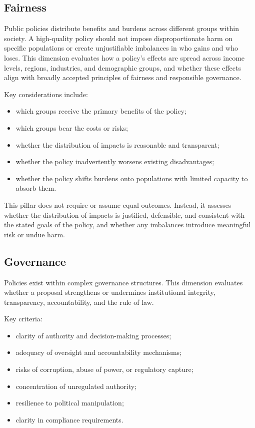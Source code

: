 \documentclass[12pt]{article}
\begin{document}
\subsection{Fairness}

Public policies distribute benefits and burdens across different groups within society. A high-quality policy should not
impose disproportionate harm on specific populations or create unjustifiable imbalances in who gains and who loses. This
dimension evaluates how a policy's effects are spread across income levels, regions, industries, and demographic groups,
and whether these effects align with broadly accepted principles of fairness and responsible governance.

Key considerations include:
\begin{itemize}
    \item which groups receive the primary benefits of the policy;
    \item which groups bear the costs or risks;
    \item whether the distribution of impacts is reasonable and transparent;
    \item whether the policy inadvertently worsens existing disadvantages;
    \item whether the policy shifts burdens onto populations with limited capacity to absorb them.
\end{itemize}

This pillar does not require or assume equal outcomes. Instead, it assesses whether the distribution of impacts is
justified, defensible, and consistent with the stated goals of the policy, and whether any imbalances introduce meaningful
risk or undue harm.

\subsection{Governance}

Policies exist within complex governance structures. This dimension evaluates whether a proposal strengthens or undermines
institutional integrity, transparency, accountability, and the rule of law.

Key criteria:
\begin{itemize}
    \item clarity of authority and decision-making processes;
    \item adequacy of oversight and accountability mechanisms;
    \item risks of corruption, abuse of power, or regulatory capture;
    \item concentration of unregulated authority;
    \item resilience to political manipulation;
    \item clarity in compliance requirements.
\end{itemize}
\end{document}
